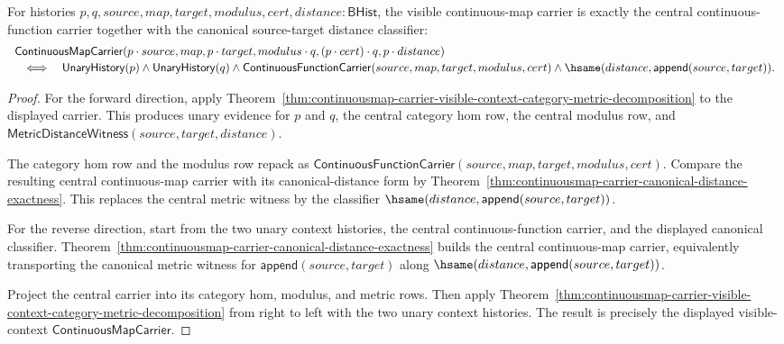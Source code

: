 \begin{theorem}
\label{thm:continuousmap-visible-context-canonical-distance-exactness}
For histories $p,q,source,map,target,modulus,cert,distance:\mathsf{BHist}$,
the visible continuous-map carrier is exactly the central continuous-function
carrier together with the canonical source-target distance classifier:
$$
\begin{array}{l}
\mathsf{ContinuousMapCarrier}(p\cdot source,map,p\cdot target,modulus\cdot q,
(p\cdot cert)\cdot q,p\cdot distance)
\\[2pt]
\quad\Longleftrightarrow\quad
\mathsf{UnaryHistory}(p)\land\mathsf{UnaryHistory}(q)\land
\mathsf{ContinuousFunctionCarrier}(source,map,target,modulus,cert)\land
\hsame(distance,\mathsf{append}(source,target)).
\end{array}
$$
\end{theorem}
\begin{proof}
For the forward direction, apply
Theorem~\ref{thm:continuousmap-carrier-visible-context-category-metric-decomposition}
to the displayed carrier. This produces unary evidence for $p$ and $q$, the
central category hom row, the central modulus row, and
$\mathsf{MetricDistanceWitness}(source,target,distance)$.

The category hom row and the modulus row repack as
$\mathsf{ContinuousFunctionCarrier}(source,map,target,modulus,cert)$. Compare
the resulting central continuous-map carrier with its canonical-distance form
by Theorem~\ref{thm:continuousmap-carrier-canonical-distance-exactness}. This
replaces the central metric witness by the classifier
$\hsame(distance,\mathsf{append}(source,target))$.

For the reverse direction, start from the two unary context histories, the
central continuous-function carrier, and the displayed canonical classifier.
Theorem~\ref{thm:continuousmap-carrier-canonical-distance-exactness} builds
the central continuous-map carrier, equivalently transporting the canonical
metric witness for $\mathsf{append}(source,target)$ along
$\hsame(distance,\mathsf{append}(source,target))$.

Project the central carrier into its category hom, modulus, and metric rows.
Then apply
Theorem~\ref{thm:continuousmap-carrier-visible-context-category-metric-decomposition}
from right to left with the two unary context histories. The result is
precisely the displayed visible-context
$\mathsf{ContinuousMapCarrier}$.
\end{proof}

